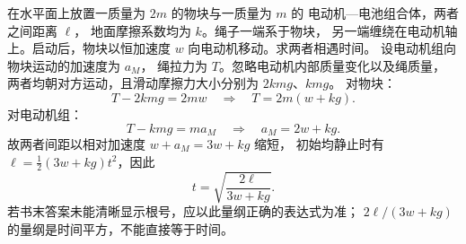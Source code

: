在水平面上放置一质量为 $2m$ 的物块与一质量为 $m$ 的
电动机—电池组合体，两者之间距离 $\ell$，
地面摩擦系数均为 $k$。绳子一端系于物块，
另一端缠绕在电动机轴上。启动后，物块以恒加速度 $w$
向电动机移动。求两者相遇时间。
\exsolution
设电动机组向物块运动的加速度为 $a_M$，
绳拉力为 $T$。忽略电动机内部质量变化以及绳质量，
两者均朝对方运动，且滑动摩擦力大小分别为 $2kmg$、$kmg$。
对物块：
\[
 T-2kmg=2mw\quad\Longrightarrow\quad T=2m(w+kg).
\]
对电动机组：
\[
 T-kmg=ma_M
 \quad\Longrightarrow\quad
 a_M=2w+kg.
\]
故两者间距以相对加速度 $w+a_M=3w+kg$ 缩短，
初始均静止时有
$\ell=\frac12(3w+kg)t^2$，因此
\[
 \boxed{t=\sqrt{\frac{2\ell}{3w+kg}}.}
\]
\excheck 若书末答案未能清晰显示根号，应以此量纲正确的表达式为准；
$2\ell/(3w+kg)$ 的量纲是时间平方，不能直接等于时间。
